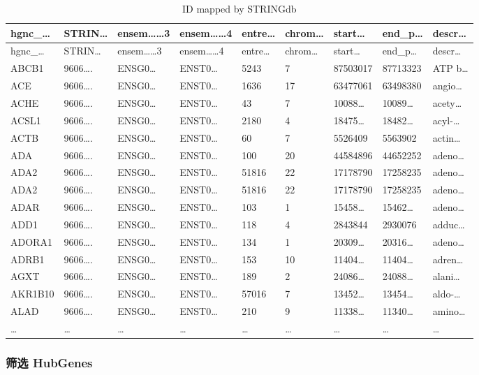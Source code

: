 \documentclass[
]{article}
\begin{document}
\begin{longtable}[]{@{}lllllllll@{}}
\caption{\label{tab:ID-mapped-by-STRINGdb}ID mapped by STRINGdb}\tabularnewline
\toprule
hgnc\_\ldots{} & STRIN\ldots{} & ensem\ldots\ldots3 & ensem\ldots\ldots4 & entre\ldots{} & chrom\ldots{} & start\ldots{} & end\_p\ldots{} & descr\ldots{}\tabularnewline
\midrule
\endfirsthead
\toprule
hgnc\_\ldots{} & STRIN\ldots{} & ensem\ldots\ldots3 & ensem\ldots\ldots4 & entre\ldots{} & chrom\ldots{} & start\ldots{} & end\_p\ldots{} & descr\ldots{}\tabularnewline
\midrule
\endhead
ABCB1 & 9606\ldots. & ENSG0\ldots{} & ENST0\ldots{} & 5243 & 7 & 87503017 & 87713323 & ATP b\ldots{}\tabularnewline
ACE & 9606\ldots. & ENSG0\ldots{} & ENST0\ldots{} & 1636 & 17 & 63477061 & 63498380 & angio\ldots{}\tabularnewline
ACHE & 9606\ldots. & ENSG0\ldots{} & ENST0\ldots{} & 43 & 7 & 10088\ldots{} & 10089\ldots{} & acety\ldots{}\tabularnewline
ACSL1 & 9606\ldots. & ENSG0\ldots{} & ENST0\ldots{} & 2180 & 4 & 18475\ldots{} & 18482\ldots{} & acyl-\ldots{}\tabularnewline
ACTB & 9606\ldots. & ENSG0\ldots{} & ENST0\ldots{} & 60 & 7 & 5526409 & 5563902 & actin\ldots{}\tabularnewline
ADA & 9606\ldots. & ENSG0\ldots{} & ENST0\ldots{} & 100 & 20 & 44584896 & 44652252 & adeno\ldots{}\tabularnewline
ADA2 & 9606\ldots. & ENSG0\ldots{} & ENST0\ldots{} & 51816 & 22 & 17178790 & 17258235 & adeno\ldots{}\tabularnewline
ADA2 & 9606\ldots. & ENSG0\ldots{} & ENST0\ldots{} & 51816 & 22 & 17178790 & 17258235 & adeno\ldots{}\tabularnewline
ADAR & 9606\ldots. & ENSG0\ldots{} & ENST0\ldots{} & 103 & 1 & 15458\ldots{} & 15462\ldots{} & adeno\ldots{}\tabularnewline
ADD1 & 9606\ldots. & ENSG0\ldots{} & ENST0\ldots{} & 118 & 4 & 2843844 & 2930076 & adduc\ldots{}\tabularnewline
ADORA1 & 9606\ldots. & ENSG0\ldots{} & ENST0\ldots{} & 134 & 1 & 20309\ldots{} & 20316\ldots{} & adeno\ldots{}\tabularnewline
ADRB1 & 9606\ldots. & ENSG0\ldots{} & ENST0\ldots{} & 153 & 10 & 11404\ldots{} & 11404\ldots{} & adren\ldots{}\tabularnewline
AGXT & 9606\ldots. & ENSG0\ldots{} & ENST0\ldots{} & 189 & 2 & 24086\ldots{} & 24088\ldots{} & alani\ldots{}\tabularnewline
AKR1B10 & 9606\ldots. & ENSG0\ldots{} & ENST0\ldots{} & 57016 & 7 & 13452\ldots{} & 13454\ldots{} & aldo-\ldots{}\tabularnewline
ALAD & 9606\ldots. & ENSG0\ldots{} & ENST0\ldots{} & 210 & 9 & 11338\ldots{} & 11340\ldots{} & amino\ldots{}\tabularnewline
\ldots{} & \ldots{} & \ldots{} & \ldots{} & \ldots{} & \ldots{} & \ldots{} & \ldots{} & \ldots{}\tabularnewline
\bottomrule
\end{longtable}

\hypertarget{ux7b5bux9009-hubgenes}{%
\subsubsection{筛选 HubGenes}\label{ux7b5bux9009-hubgenes}}
\end{document}
